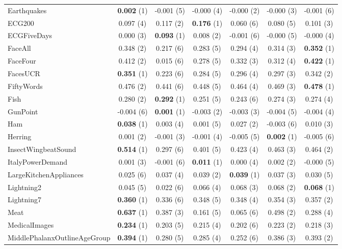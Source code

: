 \begin{table}[ht]
\begin{adjustbox}{width=\textwidth}
\begin{tabular}{lcccccc}
    Earthquakes & \textbf{0.002} (1) & -0.001 (5) & -0.000 (4) & -0.000 (2) & -0.000 (3) & -0.001 (6) \\
    ECG200 & 0.097 (4) & 0.117 (2) & \textbf{0.176} (1) & 0.060 (6) & 0.080 (5) & 0.101 (3) \\
    ECGFiveDays & 0.000 (3) & \textbf{0.093} (1) & 0.008 (2) & -0.001 (6) & -0.000 (5) & -0.000 (4) \\
    FaceAll & 0.348 (2) & 0.217 (6) & 0.283 (5) & 0.294 (4) & 0.314 (3) & \textbf{0.352} (1) \\
    FaceFour & 0.412 (2) & 0.015 (6) & 0.278 (5) & 0.332 (3) & 0.312 (4) & \textbf{0.422} (1) \\
    FacesUCR & \textbf{0.351} (1) & 0.223 (6) & 0.284 (5) & 0.296 (4) & 0.297 (3) & 0.342 (2) \\
    FiftyWords & 0.476 (2) & 0.441 (6) & 0.448 (5) & 0.464 (4) & 0.469 (3) & \textbf{0.478} (1) \\
    Fish & 0.280 (2) & \textbf{0.292} (1) & 0.251 (5) & 0.243 (6) & 0.274 (3) & 0.274 (4) \\
    GunPoint & -0.004 (6) & \textbf{0.001} (1) & -0.003 (2) & -0.003 (3) & -0.004 (5) & -0.004 (4) \\
    Ham & \textbf{0.038} (1) & 0.003 (4) & 0.001 (5) & 0.027 (2) & -0.003 (6) & 0.010 (3) \\
    Herring & 0.001 (2) & -0.001 (3) & -0.001 (4) & -0.005 (5) & \textbf{0.002} (1) & -0.005 (6) \\
    InsectWingbeatSound & \textbf{0.514} (1) & 0.297 (6) & 0.401 (5) & 0.423 (4) & 0.463 (3) & 0.464 (2) \\
    ItalyPowerDemand & 0.001 (3) & -0.001 (6) & \textbf{0.011} (1) & 0.000 (4) & 0.002 (2) & -0.000 (5) \\
    LargeKitchenAppliances & 0.025 (6) & 0.037 (4) & 0.039 (2) & \textbf{0.039} (1) & 0.037 (3) & 0.030 (5) \\
    Lightning2 & 0.045 (5) & 0.022 (6) & 0.066 (4) & 0.068 (3) & 0.068 (2) & \textbf{0.068} (1) \\
    Lightning7 & \textbf{0.360} (1) & 0.336 (6) & 0.348 (5) & 0.348 (4) & 0.354 (3) & 0.357 (2) \\
    Meat & \textbf{0.637} (1) & 0.387 (3) & 0.161 (5) & 0.065 (6) & 0.498 (2) & 0.288 (4) \\
    MedicalImages & \textbf{0.234} (1) & 0.203 (5) & 0.215 (4) & 0.202 (6) & 0.223 (2) & 0.218 (3) \\
    MiddlePhalanxOutlineAgeGroup & \textbf{0.394} (1) & 0.280 (5) & 0.285 (4) & 0.252 (6) & 0.386 (3) & 0.393 (2) \\

\end{tabular}
\end{adjustbox}
\end{table}
